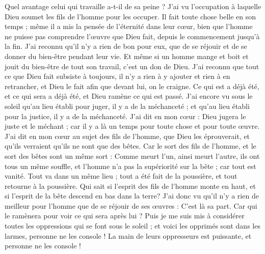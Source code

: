 \begin{multicols}{2}
Quel avantage celui qui travaille a-t-il de sa peine ?
J'ai vu l'occupation à laquelle Dieu soumet les fils de l'homme pour les occuper.
Il fait toute chose belle en son temps ; même il a mis la pensée de l'éternité dans leur cœur, bien que l'homme ne puisse pas comprendre l'œuvre que Dieu fait, depuis le commencement jusqu'à la fin.
J'ai reconnu qu'il n'y a rien de bon pour eux, que de se réjouir et de se donner du bien-être pendant leur vie.
Et même si un homme mange et boit et jouit du bien-être de tout son travail, c'est un don de Dieu.
J'ai reconnu que tout ce que Dieu fait subsiste à toujours, il n'y a rien à y ajouter et rien à en retrancher, et Dieu le fait afin que devant lui, on le craigne.
Ce qui est a déjà été, et ce qui sera a déjà été, et Dieu ramène ce qui est passé.
J'ai encore vu sous le soleil qu'au lieu établi pour juger, il y a de la méchanceté ; et qu'au lieu établi pour la justice, il y a de la méchanceté.
J'ai dit en mon cœur : Dieu jugera le juste et le méchant ; car il y a là un temps pour toute chose et pour toute œuvre.
J'ai dit en mon cœur au sujet des fils de l'homme, que Dieu les éprouverait, et qu'ils verraient qu'ils ne sont que des bêtes.
Car le sort des fils de l'homme, et le sort des bêtes sont un même sort : Comme meurt l'un, ainsi meurt l'autre, ils ont tous un même souffle, et l'homme n'a pas la supériorité sur la bête ; car tout est vanité.
Tout va dans un même lieu ; tout a été fait de la poussière, et tout retourne à la poussière.
Qui sait si l'esprit des fils de l'homme monte en haut, et si l'esprit de la bête descend en bas dans la terre?
J'ai donc vu qu'il n'y a rien de meilleur pour l'homme que de se réjouir de ses œuvres : C'est là sa part. Car qui le ramènera pour voir ce qui sera après lui ?
\VerseOne{}Puis je me suis mis à considérer toutes les oppressions qui se font sous le soleil ; et voici les opprimés sont dans les larmes, personne ne les console ! La main de leurs oppresseurs est puissante, et personne ne les console !

\end{multicols}
